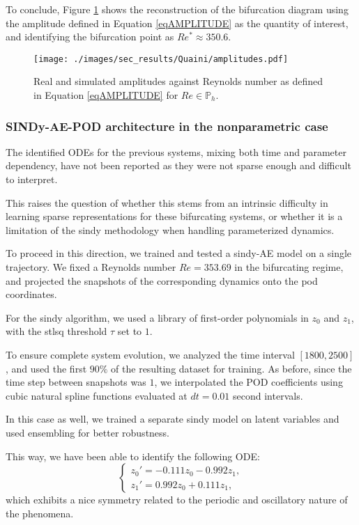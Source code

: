 \documentclass[reqno]{amsart}[standalone]
\theoremstyle{definition}
\theoremstyle{remark}
\begin{document}
To conclude, Figure \ref{figAMPLITUDE_PARAM} shows the reconstruction of the bifurcation diagram using the amplitude defined in Equation \eqref{eqAMPLITUDE} as the quantity of interest, and identifying the bifurcation point as $Re^\ast\approx350.6$.

\begin{figure}[htbp]
    \centering
    \texttt{[image: ./images/sec\_results/Quaini/amplitudes.pdf]}
    \caption{Real and simulated amplitudes against Reynolds number as defined in Equation \eqref{eqAMPLITUDE} for $Re\in\mathbb{P}_h$.}
    \label{figAMPLITUDE_PARAM}
\end{figure}

\subsubsection{SINDy-AE-POD architecture in the nonparametric case}
The identified ODEs for the previous systems, mixing both time and parameter dependency, have not been reported as they were not sparse enough and difficult to interpret.

%
This raises the question of whether this stems from an intrinsic difficulty in learning sparse representations for these bifurcating systems, or whether it is a limitation of the \gls{sindy} methodology when handling parameterized dynamics.


To proceed in this direction, we trained and tested a \gls{sindy}-AE model on a single trajectory. %
We fixed a Reynolds number $Re=353.69$ in the bifurcating regime, and projected the snapshots of the corresponding dynamics onto the \gls{pod} coordinates.
%

For the \gls{sindy} algorithm, we used a library of first-order polynomials in $z_0$ and $z_1$, with the \gls{stlsq} threshold $\tau$ set to $1$.

To ensure complete system evolution, we analyzed the time interval $[1800, 2500]$, and used the first $90\%$ of the resulting dataset for training.
As before, since the time step between snapshots was $1$, we interpolated the POD coefficients using cubic natural spline functions evaluated at $dt=0.01$ second intervals.

In this case as well, we trained a separate \gls{sindy} model on latent variables and used ensembling for better robustness.
%

This way, we have been able to identify the following ODE:
\begin{equation*}
\begin{cases}
z_0' = -0.111 z_0 - 0.992 z_1 , \\
z_1' = 0.992 z_0 + 0.111 z_1 ,
\end{cases}
\end{equation*}
which exhibits a nice symmetry related to the periodic and oscillatory nature of the phenomena.
\end{document}
